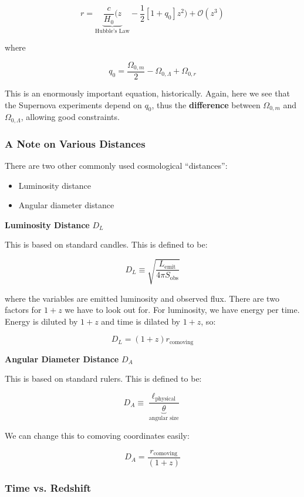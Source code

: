 \documentclass{article}
\newcommand{\be}{\begin{equation}}
\newcommand{\ee}{\end{equation}}
\begin{document}
\be
\boxed{r = \underbrace{\frac{c}{H_0}(z}_\text{Hubble's Law}-\frac{1}{2}\left[1+q_0\right]z^2) + \mathcal{O}(z^3)}
\ee

where 

\be
q_0 = \frac{\Omega_{0,m}}{2} - \Omega_{0,\Lambda} + \Omega_{0,r}
\ee

This is an enormously important equation, historically. Again, here we see that the Supernova experiments depend on $q_0$, thus the \textbf{difference} between $\Omega_{0,m}$ and $\Omega_{0,\Lambda}$, allowing good constraints. 

\subsubsection{A Note on Various Distances}

There are two other commonly used cosmological ``distances'':

\begin{itemize}
    \item Luminosity distance
    \item Angular diameter distance
\end{itemize}

\noindent\textbf{Luminosity Distance} $D_L$

This is based on standard candles. This is defined to be:

\be
D_L \equiv \sqrt{\frac{L_\text{emit}}{4\pi S_\text{obs}}}
\ee

where the variables are emitted luminosity and observed flux. There are two factors for $1+z$ we have to look out for. For luminosity, we have energy per time. Energy is diluted by $1+z$ and time is dilated by $1+z$, so:

\be
D_L = \left(1+z\right) r_\text{comoving}
\ee

\noindent\textbf{Angular Diameter Distance} $D_A$

This is based on standard rulers. This is defined to be:

\be
D_A \equiv \frac{\ell_\text{physical}}{\underbrace{\theta}_\text{angular size}}
\ee

We can change this to comoving coordinates easily:

\be
D_A = \frac{r_\text{comoving}}{\left(1+z\right)}
\ee

\subsubsection{Time vs. Redshift}
\end{document}
